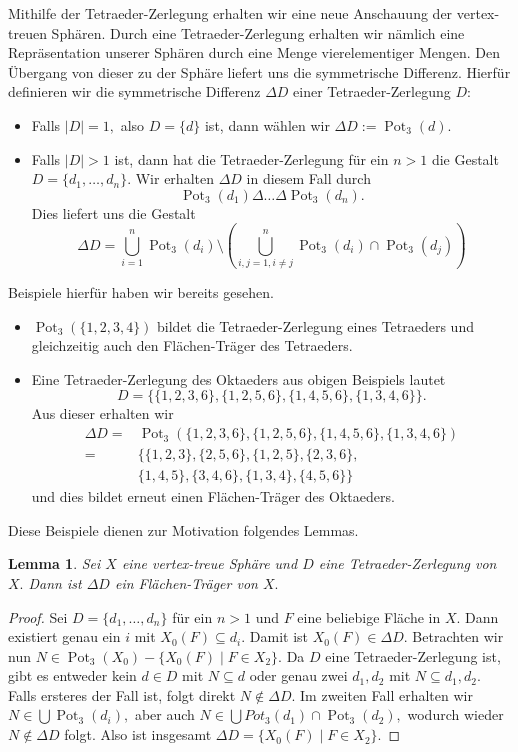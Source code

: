 \documentclass[12pt,titlepage,twoside,cleardoublepage]{article}
\theoremstyle{nummermitklammern}
\newtheorem{lemma}[temp]{Lemma}
\newtheorem{lemma}[zahl]{Lemma}
\numberwithin{equation}{section}
\DeclareMathOperator{\Pot}{Pot}
\begin{document}
Mithilfe der Tetraeder-Zerlegung erhalten wir eine neue Anschauung der vertex-treuen Sphären. Durch eine Tetraeder-Zerlegung erhalten wir nämlich eine Repräsentation unserer Sphären durch eine Menge vierelementiger Mengen. Den Übergang von dieser zu der Sphäre liefert uns die symmetrische Differenz. Hierfür definieren wir die symmetrische Differenz $\Delta D$ einer Tetraeder-Zerlegung $D:$
\begin{itemize}
\item Falls $\vert D\vert =1,$ also $D=\{d\}$ ist, dann wählen wir $\Delta D:=\Pot_3(d).$
\item Falls $\vert D\vert >1$ ist, dann hat die Tetraeder-Zerlegung für ein $n>1$ die Gestalt $D=\{d_1,\ldots,d_n\}.$
Wir  erhalten $\Delta D$ in diesem Fall durch
\[
\Pot_3(d_1)\Delta \ldots \Delta \Pot_3(d_n).
\]
Dies liefert uns die Gestalt 
\[
\Delta D=\bigcup^n_{i=1} \Pot_3(d_i)\setminus  (\bigcup^n_{i,j=1,i\neq j}\Pot_3(d_i)\cap \Pot_3(d_j))
\]
\end{itemize} 
Beispiele hierfür haben wir bereits gesehen.
\begin{itemize}
\item $\Pot_3(\{1,2,3,4\})$ bildet die Tetraeder-Zerlegung eines Tetraeders und gleichzeitig auch den Flächen-Träger des Tetraeders.
\item Eine Tetraeder-Zerlegung des Oktaeders aus obigen Beispiels lautet
 \[
D=\{\{1,2,3,6\},\{1,2,5,6\},\{1,4,5,6\},\{1,3,4,6\}\}. 
 \]
 Aus dieser erhalten wir 
 \begin{align*}
\Delta D=&\Pot_3(\{1,2,3,6\},\{1,2,5,6\},\{1,4,5,6\},\{1,3,4,6\})\\
=&\{\{1,2,3\},\{2,5,6\},\{1,2,5\},\{2,3,6\},\\
&\{1,4,5\},\{3,4,6\},\{1,3,4\},\{4,5,6\}\}
\end{align*}
und dies bildet erneut einen Flächen-Träger des Oktaeders.
\end{itemize} 
Diese Beispiele dienen zur Motivation folgendes Lemmas.
\begin{lemma}
Sei $X$ eine vertex-treue Sphäre und $D$ eine Tetraeder-Zerlegung von $X.$ Dann ist $\Delta D$ ein Flächen-Träger von $X.$
\end{lemma}
\begin{proof}
Sei $D=\{d_1,\ldots,d_n\}$ für ein $n>1$
und $F$ eine beliebige Fläche in $X.$ Dann existiert genau ein $i$ mit $X_0(F)\subseteq d_i.$ Damit ist $X_0(F) \in \Delta D.$ Betrachten wir nun $N\in \Pot_3(X_0)-\{X_0(F)\mid F\in X_2\}.$ Da $D$ eine Tetraeder-Zerlegung ist, gibt es entweder kein $d\in D$ mit $N\subseteq d$ oder genau zwei $d_1,d_2$ mit $N\subseteq d_1,d_2.$ Falls ersteres der Fall ist, folgt direkt $N\notin \Delta D.$ Im zweiten Fall erhalten wir $N\in \bigcup \Pot_3(d_i),$ aber auch $N\in \bigcup Pot_3(d_1)\cap \Pot_3(d_2),$ wodurch wieder $N\notin \Delta D$ folgt. 
Also ist insgesamt $\Delta D=\{X_0(F)\mid F\in X_2\}.$ 
\end{proof}
\end{document}

